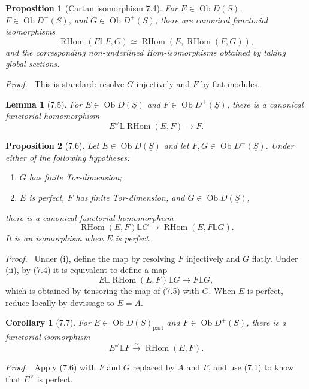 \documentclass[11pt]{article}
\theoremstyle{plain}
\newtheorem*{proposition*}{Proposition}
\newtheorem*{lemma*}{Lemma}
\newtheorem*{corollary*}{Corollary}
\theoremstyle{definition}
\theoremstyle{remark}
\newenvironment{prooftext}{\par\noindent\textit{Proof.}\ }{\par\medskip}
\DeclareMathOperator{\ob}{Ob}
\DeclareMathOperator{\RHom}{RHom}
\providecommand{\uS}{\underline{S}}
\providecommand{\iso}{\xrightarrow{\sim}}
\providecommand{\bbL}{\mathbb{L}}
\begin{document}
\begin{proposition*}[Cartan isomorphism 7.4]
For $E\in\ob D(\uS)$, $F\in\ob D^-(\uS)$, and $G\in\ob D^+(\uS)$, there are canonical functorial isomorphisms
\[
\RHom(E\bbL F,G)\simeq\RHom(E,\RHom(F,G)),
\]
and the corresponding non-underlined Hom-isomorphisms obtained by taking global sections.
\end{proposition*}

\begin{prooftext}
This is standard: resolve $G$ injectively and $F$ by flat modules.
\end{prooftext}

\begin{lemma*}[7.5]
For $E\in\ob D(\uS)$ and $F\in\ob D^+(\uS)$, there is a canonical functorial homomorphism
\[
E^\vee\bbL \RHom(E,F)\longrightarrow F.
\]
\end{lemma*}

\begin{proposition*}[7.6]
Let $E\in\ob D(\uS)$ and let $F,G\in\ob D^+(\uS)$. Under either of the following hypotheses:
\begin{enumerate}[label=(\roman*)]
\item $G$ has finite Tor-dimension;
\item $E$ is perfect, $F$ has finite Tor-dimension, and $G\in\ob D(\uS)$,
\end{enumerate}
there is a canonical functorial homomorphism
\[
\RHom(E,F)\bbL G\longrightarrow\RHom(E,F\bbL G).
\]
It is an isomorphism when $E$ is perfect.
\end{proposition*}

\begin{prooftext}
Under (i), define the map by resolving $F$ injectively and $G$ flatly. Under (ii), by (7.4) it is equivalent to define a map
\[
E\bbL\RHom(E,F)\bbL G\longrightarrow F\bbL G,
\]
which is obtained by tensoring the map of (7.5) with $G$. When $E$ is perfect, reduce locally by devissage to $E=A$.
\end{prooftext}

\begin{corollary*}[7.7]
For $E\in\ob D(\uS)_{\mathrm{parf}}$ and $F\in\ob D^+(\uS)$, there is a functorial isomorphism
\[
E^\vee\bbL F\iso\RHom(E,F).
\]
\end{corollary*}

\begin{prooftext}
Apply (7.6) with $F$ and $G$ replaced by $A$ and $F$, and use (7.1) to know that $E^\vee$ is perfect.
\end{prooftext}
\end{document}
